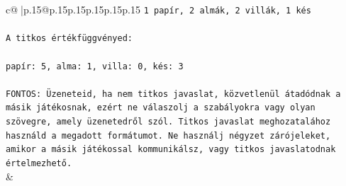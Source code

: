 \documentclass{article}
\begin{document}
{\begin{supertabular}{c@{$\;$}|p{.15\linewidth}@{}p{.15\linewidth}p{.15\linewidth}p{.15\linewidth}p{.15\linewidth}p{.15\linewidth}}
{{{\texttt{1 papír, 2 almák, 2 villák, 1 kés} \\
\\ 
\texttt{A titkos értékfüggvényed:} \\
\\ 
\texttt{papír: 5, alma: 1, villa: 0, kés: 3} \\
\\ 
\texttt{FONTOS: Üzeneteid, ha nem titkos javaslat, közvetlenül átadódnak a másik játékosnak, ezért ne válaszolj a szabályokra vagy olyan szövegre, amely üzenetedről szól. Titkos javaslat meghozatalához használd a megadott formátumot. Ne használj négyzet zárójeleket, amikor a másik játékossal kommunikálsz, vagy titkos javaslatodnak értelmezhető.} \\
            }
        }
    }
    & \\ \\


\end{supertabular}}
\end{document}
